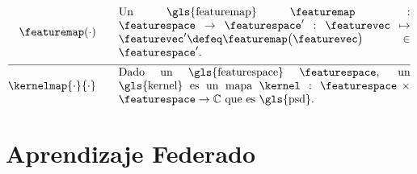 \begin{align}
	\featuremap(\cdot)  \quad\quad & \parbox{.75\textwidth}{Un \gls{featuremap} $\featuremap: \featurespace \rightarrow \featurespace' : \featurevec \mapsto \featurevec' \defeq \featuremap\big( \featurevec \big) \in \featurespace'$.}   \nonumber \\[2mm] \hline \nonumber\\[-5mm]
	\kernelmap{\cdot}{\cdot} \quad\quad & \parbox{.75\textwidth}{Dado un \gls{featurespace} $\featurespace$, 
		un \gls{kernel} es un mapa $\kernel: \featurespace \times \featurespace \rightarrow \mathbb{C}$ que es \gls{psd}.}    \nonumber                                                                                                                                                     
\end{align}               






\newpage
\section*{Aprendizaje Federado}

